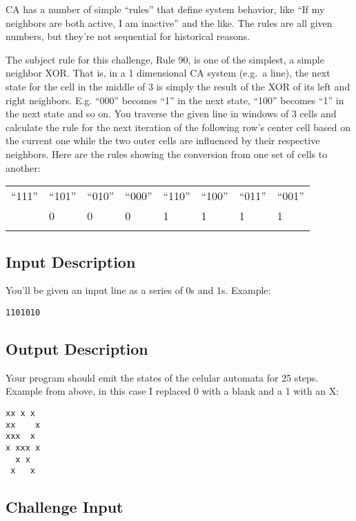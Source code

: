CA has a number of simple ``rules'' that define system behavior, like
``If my neighbors are both active, I am inactive'' and the like. The
rules are all given numbers, but they're not sequential for historical
reasons.

The subject rule for this challenge, Rule 90, is one of the simplest, a
simple neighbor XOR. That is, in a 1 dimensional CA system (e.g.~a
line), the next state for the cell in the middle of 3 is simply the
result of the XOR of its left and right neighbors. E.g. ``000'' becomes
``1'' in the next state, ``100'' becomes ``1'' in the next state and so
on. You traverse the given line in windows of 3 cells and calculate the
rule for the next iteration of the following row's center cell based on
the current one while the two outer cells are influenced by their
respective neighbors. Here are the rules showing the conversion from one
set of cells to another:

\begin{longtable}[c]{@{}llllllll@{}}
\toprule\addlinespace
``111'' & ``101'' & ``010'' & ``000'' & ``110'' & ``100'' & ``011'' &
``001''
\\\addlinespace
\midrule\endhead
0 & 0 & 0 & 0 & 1 & 1 & 1 & 1
\\\addlinespace
\bottomrule
\end{longtable}

\subsection{Input Description}\label{input-description-2}

You'll be given an input line as a series of 0s and 1s. Example:

\begin{verbatim}
1101010
\end{verbatim}

\subsection{Output Description}\label{output-description-2}

Your program should emit the states of the celular automata for 25
steps. Example from above, in this case I replaced 0 with a blank and a
1 with an X:

\begin{verbatim}
xx x x
xx    x
xxx  x
x xxx x
  x x
 x   x
\end{verbatim}

\subsection{Challenge Input}\label{challenge-input-3}

